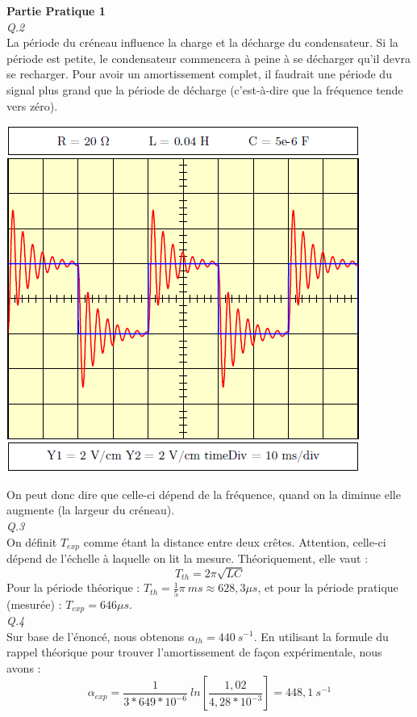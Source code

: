 \documentclass	[11pt, a4paper, openany]{book}
\begin{document}
\textbf{Partie Pratique 1}\\
\textit{Q.2}\\
La période du créneau influence la charge et la décharge du condensateur. Si la période est petite, le condensateur commencera à peine à se décharger qu'il devra se recharger. Pour avoir un amortissement complet, il faudrait une période du signal plus grand que la période de décharge (c'est-à-dire que la fréquence tende vers zéro).
\begin{center}
\includegraphics[scale=0.5]{labo/image34.png}
\end{center}
On peut donc dire que celle-ci dépend de la fréquence, quand on la diminue elle augmente (la largeur du créneau).\\

\textit{Q.3}\\
On définit $T_{exp}$ comme étant la distance entre deux crêtes. Attention, celle-ci dépend de l'échelle à laquelle on lit la mesure. Théoriquement, elle vaut : 
\begin{equation}
T_{th} = 2\pi \sqrt{LC}
\end{equation}
Pour la période théorique : $T_{th} = \frac{1}{5}\pi\ ms \approx 628,3\mu s$, et pour la période pratique (mesurée) : $T_{exp} = 646 \mu s$.\\

\textit{Q.4}\\
Sur base de l'énoncé, nous obtenons $\alpha_{th} = 440\ s^{-1}$. En utilisant la formule du rappel théorique pour trouver l'amortissement de façon expérimentale, nous avons :
\begin{equation}
\alpha_{exp} = \frac{1}{3 * 649*10^{-6}}\ ln\left[\frac{1,02}{4,28*10^{-3}}\right] = 448,1\ s^{-1}
\end{equation}
\end{document}
